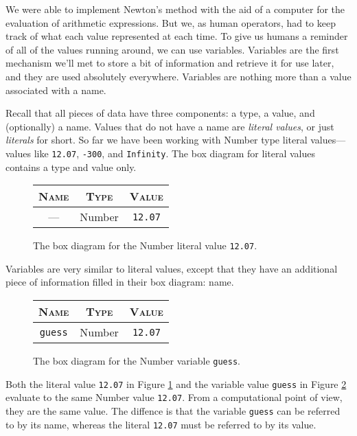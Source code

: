 We were able to implement Newton's method with the aid of a computer for the
evaluation of arithmetic expressions. But we, as human operators, had to keep
track of what each value represented at each time. To give us humans a reminder
of all of the values running around, we can use variables. Variables are the
first mechanism we'll met to store a bit of information and retrieve it for use
later, and they are used absolutely everywhere. Variables are nothing more than
a value associated with a name.

Recall that all pieces of data have three components: a type, a value, and
(optionally) a name. Values that do not have a name are \emph{literal values},
or just \emph{literals} for short. So far we have been working with Number type
literal values---values like \texttt{12.07}, \texttt{-300}, and
\texttt{Infinity}. The box diagram for literal values contains a type and value
only.

\begin{figure}[h]
\begin{tabular}{|c|c|c|}
  \hline
  \textsc{Name} & \textsc{Type} & \textsc{Value}\\
  \hline
  --- & \textsf{Number} & \texttt{12.07}\\
  \hline
\end{tabular}
\caption{\label{fig:intro-literal}The box diagram for the Number literal value
\texttt{12.07}.}
\end{figure}

Variables are very similar to literal values, except that they have an
additional piece of information filled in their box diagram: name.

\begin{figure}[h]
\begin{tabular}{|c|c|c|}
  \hline
  \textsc{Name} & \textsc{Type} & \textsc{Value}\\
  \hline
  \texttt{guess} & \textsf{Number} & \texttt{12.07}\\
  \hline
\end{tabular}
\caption{\label{fig:intro-variable} The box diagram for the Number variable
\texttt{guess}.}
\end{figure}

Both the literal value \texttt{12.07} in Figure \ref{fig:intro-literal} and the
variable value \texttt{guess} in Figure \ref{fig:intro-variable} evaluate to the
same Number value \texttt{12.07}. From a computational point of view, they are
the same value. The diffence is that the variable \texttt{guess} can be referred
to by its name, whereas the literal \texttt{12.07} must be referred to by its
value.

